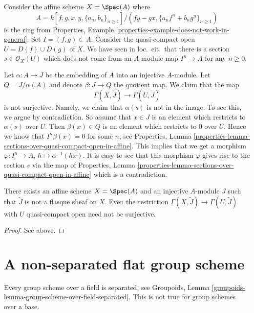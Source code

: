 \medskip\noindent
Consider the affine scheme $X = \Spec(A)$
where
$$
A = k[f, g, x, y, \{a_n, b_n\}_{n \geq1}]/
(fy - gx, \{a_nf^n + b_ng^n\}_{n \geq 1})
$$
is the ring from
Properties, Example \ref{properties-example-does-not-work-in-general}.
Set $I = (f, g) \subset A$.
Consider the quasi-compact open $U = D(f) \cup D(g)$ of $X$.
We have seen in loc.\ cit.\ that there is a section
$s \in \mathcal{O}_X(U)$ which does not come from an $A$-module
map $I^n \to A$ for any $n \geq 0$.

\medskip\noindent
Let $\alpha : A \to J$ be the embedding of $A$ into an injective $A$-module.
Let $Q = J/\alpha(A)$ and denote $\beta : J \to Q$ the quotient map.
We claim that the map
$$
\Gamma(X, \widetilde{J})
\longrightarrow
\Gamma(U, \widetilde{J})
$$
is not surjective. Namely, we claim that $\alpha(s)$ is not in the image.
To see this, we argue by contradiction. So assume that $x \in J$ is an
element which restricts to $\alpha(s)$ over $U$. Then $\beta(x) \in Q$
is an element which restricts to $0$ over $U$. Hence we know that
$I^n\beta(x) = 0$ for some $n$, see
Properties,
Lemma \ref{properties-lemma-sections-over-quasi-compact-open-in-affine}.
This implies that we get a morphism
$\varphi : I^n \to A$, $h \mapsto \alpha^{-1}(hx)$. It is easy to see that
this morphism $\varphi$ gives rise to the section $s$ via the map of
Properties,
Lemma \ref{properties-lemma-sections-over-quasi-compact-open-in-affine}
which is a contradiction.

\begin{lemma}
\label{lemma-nonflasque}
There exists an affine scheme $X = \Spec(A)$ and an injective
$A$-module $J$ such that $\widetilde{J}$ is not a flasque sheaf on $X$.
Even the restriction $\Gamma(X, \widetilde{J}) \to \Gamma(U, \widetilde{J})$
with $U$ quasi-compact open need not be surjective.
\end{lemma}

\begin{proof}
See above.
\end{proof}





\section{A non-separated flat group scheme}
\label{section-non-separated-group-scheme}

\noindent
Every group scheme over a field is separated, see
Groupoids, Lemma \ref{groupoids-lemma-group-scheme-over-field-separated}.
This is not true for group schemes over a base.

